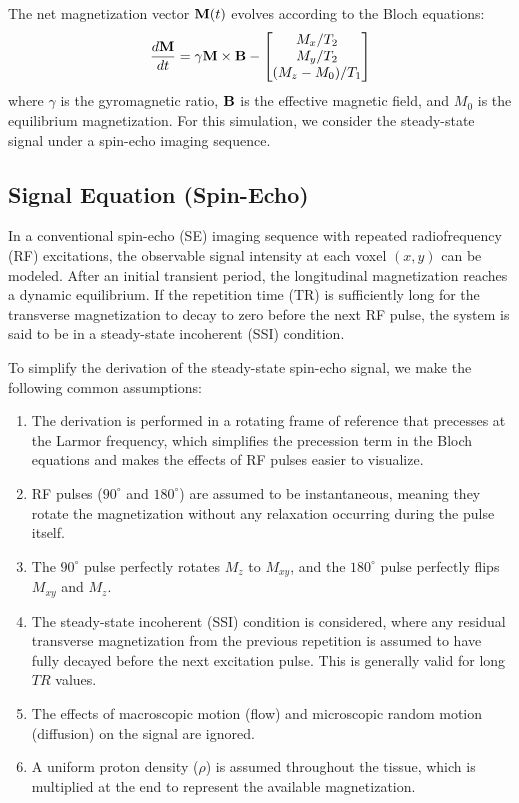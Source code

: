 \documentclass[10pt,a4paper,twoside]{article}
\begin{document}
The net magnetization vector \(\vb{M}(t)\) evolves according to the Bloch equations:
\begin{align}
\frac{d\vb{M}}{dt} = \gamma \vb{M} \times \vb{B} - 
\begin{bmatrix}
    M_x / T_2 \\
    M_y / T_2 \\
    (M_z - M_0)/ T_1
\end{bmatrix}
\end{align}
where \( \gamma \) is the gyromagnetic ratio, \( \vb{B} \) is the effective magnetic field, and \( M_0 \) is the equilibrium magnetization. For this simulation, we consider the steady-state signal under a spin-echo imaging sequence.

\subsection{Signal Equation (Spin-Echo)}

In a conventional spin-echo (SE) imaging sequence with repeated radiofrequency (RF) excitations, the observable signal intensity at each voxel $(x, y)$ can be modeled. After an initial transient period, the longitudinal magnetization reaches a dynamic equilibrium. If the repetition time (TR) is sufficiently long for the transverse magnetization to decay to zero before the next RF pulse, the system is said to be in a steady-state incoherent (SSI) condition. 

To simplify the derivation of the steady-state spin-echo signal, we make the following common assumptions:
\begin{enumerate}
    \item The derivation is performed in a rotating frame of reference that precesses at the Larmor frequency, which simplifies the precession term in the Bloch equations and makes the effects of RF pulses easier to visualize.
    \item RF pulses ($90^\circ$ and $180^\circ$) are assumed to be instantaneous, meaning they rotate the magnetization without any relaxation occurring during the pulse itself.
    \item The $90^\circ$ pulse perfectly rotates $M_z$ to $M_{xy}$, and the $180^\circ$ pulse perfectly flips $M_{xy}$ and $M_z$.
    \item The steady-state incoherent (SSI) condition is considered, where any residual transverse magnetization from the previous repetition is assumed to have fully decayed before the next excitation pulse. This is generally valid for long $TR$ values.
    \item The effects of macroscopic motion (flow) and microscopic random motion (diffusion) on the signal are ignored.
    \item A uniform proton density ($\rho$) is assumed throughout the tissue, which is multiplied at the end to represent the available magnetization.
\end{enumerate}
\end{document}
